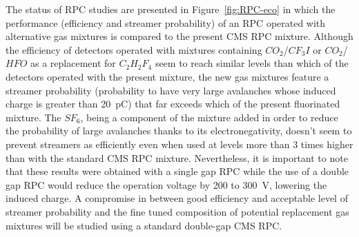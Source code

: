 	The status of RPC studies are presented in Figure~\ref{fig:RPC-eco} in which the performance (efficiency and streamer probability) of an RPC operated with alternative gas mixtures is compared to the present CMS RPC mixture. Although the efficiency of detectors operated with mixtures containing $CO_2$/$CF_3I$ or $CO_2$/$HFO$ as a replacement for $C_2H_2F_4$ seem to reach similar levels than which of the detectors operated with the present mixture, the new gas mixtures feature a streamer probability (probability to have very large avalanches whose induced charge is greater than \SI{20}{pC}) that far exceeds which of the present fluorinated mixture. The $SF_6$, being a component of the mixture added in order to reduce the probability of large avalanches thanks to its electronegativity, doesn't seem to prevent streamers as efficiently even when used at levels more than 3 times higher than with the standard CMS RPC mixture. Nevertheless, it is important to note that these results were obtained with a single gap RPC while the use of a double gap RPC would reduce the operation voltage by 200 to \SI{300}{V}, lowering the induced charge. A compromise in between good efficiency and acceptable level of streamer probability and the fine tuned composition of potential replacement gas mixtures will be studied using a standard double-gap CMS RPC.

\clearpage{\pagestyle{empty}\cleardoublepage}